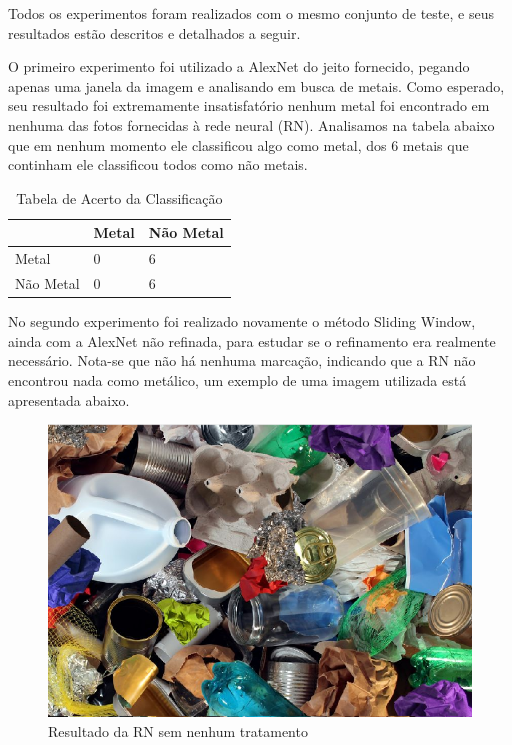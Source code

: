 \documentclass[conference, compsoc, 12pt]{IEEEtran}
\begin{document}
Todos os experimentos foram realizados com o mesmo conjunto de teste, e seus resultados estão descritos e detalhados a seguir.

O primeiro experimento foi utilizado a AlexNet do jeito fornecido, pegando apenas uma janela da imagem e analisando em busca de metais. Como esperado, seu resultado foi extremamente insatisfatório nenhum metal foi encontrado em nenhuma das fotos fornecidas à rede neural (RN).
Analisamos na tabela abaixo que em nenhum momento ele classificou algo como metal, dos 6 metais que continham ele classificou todos como não metais.

\begin{table}[]
\centering
\caption{Tabela de Acerto da Classificação}
\begin{tabular}{|l|l|l|}
\hline
          & Metal & Não Metal \\ \hline
Metal     & 0     & 6         \\ \hline
Não Metal & 0     & 6         \\ \hline
\end{tabular}
\end{table}


No segundo experimento foi realizado novamente o método Sliding Window, ainda com a AlexNet não refinada, para estudar se o refinamento era realmente necessário. Nota-se que não há nenhuma marcação, indicando que a RN não encontrou nada como metálico, um exemplo de uma imagem utilizada está apresentada abaixo.

\begin{figure}[ht]
    \centering
    \includegraphics[width=.9\linewidth]{not_train_100.png}
    \caption{Resultado da RN sem nenhum tratamento}
\end{figure}
\end{document}
